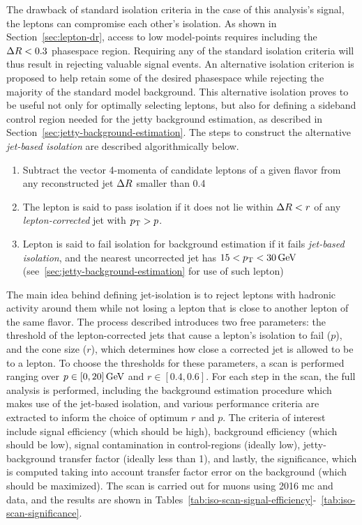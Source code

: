 The drawback of standard isolation criteria in the case of this analysis’s  signal, the leptons can compromise each other's isolation. As shown in Section~\ref{sec:lepton-dr}, access to low \dm model-points requires including the $\Delta R<0.3$ phasespace region. Requiring any of the standard isolation criteria will thus result in rejecting valuable signal events. An alternative isolation criterion is proposed to help retain some of the desired phasespace while rejecting the majority of the standard model background. This alternative isolation proves to be useful not only for optimally selecting leptons, but also for defining a sideband control region needed for the jetty background estimation, as described in Section~\ref{sec:jetty-background-estimation}. The steps to construct the alternative \emph{jet-based isolation} are described algorithmically below.
\begin{enumerate}
\item Subtract the vector 4-momenta of candidate leptons of a given flavor from any reconstructed jet $\Delta R$ smaller than 0.4
\item The lepton is said to pass isolation if it does not lie within $\Delta R<r$ of any \emph{lepton-corrected} jet with $p_{\mathrm{T}} > p$. 
\item Lepton is said to fail isolation for background estimation if it fails \emph{jet-based isolation}, and the nearest uncorrected jet has $15<p_{\mathrm{T}}<30\,\text{Ge\hspace{-.08em}V}$ (see~\ref{sec:jetty-background-estimation} for use of such lepton)
\end{enumerate}
The main idea behind defining jet-isolation is to reject leptons with hadronic activity around them while not losing a lepton that is close to another lepton of the same flavor. The process described introduces two free parameters: the \pt threshold of the lepton-corrected jets that cause a lepton's isolation to fail ($p$), and the cone size ($r$), which determines how close a corrected jet is allowed to be to a lepton. To choose the thresholds for these parameters, a scan is performed ranging over $p\in [0,20]\,\text{Ge\hspace{-.08em}V}$ and $r\in[0.4,0.6]$. For each step in the scan, the full analysis is performed, including the background estimation procedure which makes use of the jet-based isolation, and various performance criteria are extracted to inform the choice of optimum $r$ and $p$.  The criteria of interest include signal efficiency (which should be high), background efficiency (which should be low), signal contamination in control-regions (ideally low), jetty-background transfer factor (ideally less than 1), and lastly, the significance, which is computed taking into account transfer factor error on the background (which should be maximized). The scan is carried out for muons using 2016 \gls{mc} and data, and the results are shown in Tables~\ref{tab:iso-scan-signal-efficiency}-~\ref{tab:iso-scan-significance}.

